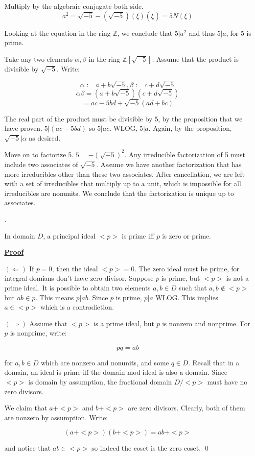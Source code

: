 \documentclass{article}
\newcounter{problemcnt}
\newcommand{\Problem}{{
    \vspace{5mm}
    \stepcounter{problemcnt}
    \noindent
    \arabic{problemcnt}. 
}
}
\newcommand{\Proof}{{
    \vspace{2mm}
    \noindent
    \textbf{
    \underline{Proof}}
}
}
\begin{document}
Multiply by the algebraic conjugate both side.
\[
    a^2 = \sqrt{-5}-(\sqrt{-5})(\xi)(\bar{\xi}) = 5N(\xi)
\]

Looking at the equation in the ring $\mathbb{Z}$,
we conclude that $5|a^2$ and thus $5|a$, for 5 is prime. 

Take any two elements $\alpha, \beta$ in 
the ring $\mathbb{Z}[\sqrt{-5}]$. Assume 
that the product is divisible by 
$\sqrt{-5}$. Write:

\[
    \alpha := a + b\sqrt{-5},
    \beta := c + d\sqrt{-5}
\]
\[
    \alpha\beta = (a + b\sqrt{-5})
    (c + d\sqrt{-5})
\]
\[
    = ac-5bd+\sqrt{-5}(ad+bc)
\]

The real part of the product must be 
divisible by 5, by the proposition that 
we have proven. $5|(ac-5bd)$ so 
$5|ac$. WLOG, $5|a$. Again, by the proposition,
$\sqrt{-5}|\alpha$ as desired. 

Move on to factorize 5. $5 = -(\sqrt{-5})^2$. 
Any irreducible factorization of 5 must 
include two associates of $\sqrt{-5}$. 
Assume we have another factorization that 
has more irreducibles other than these 
two associates. After cancellation, 
we are left with a set of irreducibles 
that multiply up to a unit, which is 
impossible for all irreducibles are nonunits. 
We conclude that the factorization is unique 
up to associates. 



\Problem
In domain $D$, a principal ideal $<p>$ 
is prime iff $p$ is zero or prime. 

\Proof
$(\Leftarrow)$
If $p = 0$, then the ideal $<p> = {0}$. 
The zero ideal must be prime, for integral 
domians don't have zero divisor. Suppose 
$p$ is prime, but $<p>$ is not a prime ideal. 
It is possible to obtain two elements $a, b \in D$
such that $a, b \notin <p>$ but $ab \in p$.
This means $p|ab$.  
Since $p$ is prime, $p|a$ WLOG. 
This implies $a \in <p>$ which is a contradiction. 

$(\Rightarrow)$
Assume that $<p>$ is a prime ideal, but 
$p$ is nonzero and nonprime. For $p$ is 
nonprime, write:

\[
    pq = ab
\]

for $a, b\in D$ which are nonzero and nonunits, and some 
$q \in D$. Recall that in a domain, 
an ideal is prime iff the domain mod 
ideal is also a domain. Since $<p>$ is 
domain by assumption, the fractional 
domain $D/<p>$ must have no zero divisors. 

We claim that $a + <p>$ and $b+<p>$ are 
zero divisors. Clearly, both of them are 
nonzero by assumption. Write:

\[(a+<p>)(b+<p>) = ab+<p>\]

and notice that $ab\in <p>$ so indeed 
the coset is the zero coset. \qed
\end{document}
